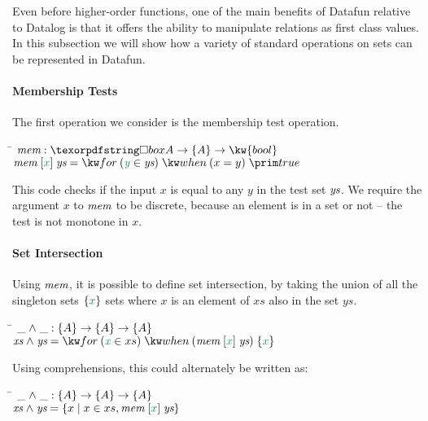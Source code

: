 Even before higher-order functions, one of the main benefits of
Datafun relative to Datalog is that it offers the ability to manipulate relations
as first class values. In this subsection we will show how a variety
of standard operations on sets can be represented in Datafun. 

\paragraph{Membership Tests} The first operation we consider is the
membership test operation. 
\begin{tabbing}
  \qquad\=\+ \kill
  $\name{mem} : \iso A \to \tset A \to \kw{bool}$ \\
  $\name{mem}\;\ebox{x} \; \name{ys} = \efor{y}{\name{ys}}\ewhen{x = y}{\etrue}$ 
\end{tabbing}

This code checks if the input $x$
is equal to any $y$ in the test set $\text{\itshape ys}$. We require the argument $x$ to
$\text{\itshape mem}$ to be discrete, because an element is in a set or not -- the test
is not monotone in $x$. 

\paragraph{Set Intersection}
Using $\text{\itshape mem}$, it is possible to define set intersection, by taking the union of
all the singleton sets $\eset{x}$ sets where $x$ is an element of $xs$ also in the set $ys$.

\begin{tabbing}
  \qquad\=\+ \kill
  $\_ \wedge \_ : \tset A \to \tset A \to \tset A$ \\
  $\name{xs} \wedge \name{ys} = \efor{x}{xs} \ewhen{\name{mem}\;\ebox{x}\;\name{ys}}{\eset{x}}$ 
\end{tabbing}
Using comprehensions, this could alternately be written as:
\begin{tabbing}
  \qquad\=\+ \kill
  $\_ \wedge \_ : \tset A \to \tset A \to \tset A$ \\
  $\name{xs} \wedge \name{ys} = \setfor{x}{x \in xs, \name{mem}\;\ebox{x}\;\name{ys}}$
\end{tabbing}


